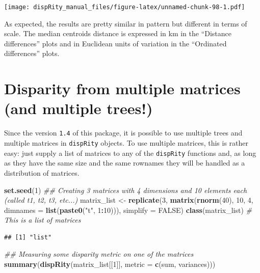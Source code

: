 \documentclass[]{book}
\newenvironment{Shaded}{\begin{snugshade}}{\end{snugshade}}
\newcommand{\CommentTok}[1]{\textcolor[rgb]{0.56,0.35,0.01}{\textit{#1}}}
\newcommand{\DataTypeTok}[1]{\textcolor[rgb]{0.13,0.29,0.53}{#1}}
\newcommand{\DecValTok}[1]{\textcolor[rgb]{0.00,0.00,0.81}{#1}}
\newcommand{\KeywordTok}[1]{\textcolor[rgb]{0.13,0.29,0.53}{\textbf{#1}}}
\newcommand{\NormalTok}[1]{#1}
\newcommand{\OperatorTok}[1]{\textcolor[rgb]{0.81,0.36,0.00}{\textbf{#1}}}
\newcommand{\OtherTok}[1]{\textcolor[rgb]{0.56,0.35,0.01}{#1}}
\newcommand{\StringTok}[1]{\textcolor[rgb]{0.31,0.60,0.02}{#1}}
\begin{document}
\texttt{[image: dispRity\_manual\_files/figure-latex/unnamed-chunk-98-1.pdf]}

As expected, the results are pretty similar in pattern but different in terms of scale.
The median centroids distance is expressed in km in the ``Distance differences'' plots and in Euclidean units of variation in the ``Ordinated differences'' plots.

\hypertarget{multi.input}{%
\section{Disparity from multiple matrices (and multiple trees!)}\label{multi.input}}

Since the version \texttt{1.4} of this package, it is possible to use multiple trees and multiple matrices in \texttt{dispRity} objects.
To use multiple matrices, this is rather easy: just supply a list of matrices to any of the \texttt{dispRity} functions and, as long as they have the same size and the same rownames they will be handled as a distribution of matrices.

\begin{Shaded}
\begin{Highlighting}[]
\KeywordTok{set.seed}\NormalTok{(}\DecValTok{1}\NormalTok{)}
\CommentTok{## Creating 3 matrices with 4 dimensions and 10 elements each (called t1, t2, t3, etc...)}
\NormalTok{matrix_list <-}\StringTok{ }\KeywordTok{replicate}\NormalTok{(}\DecValTok{3}\NormalTok{, }\KeywordTok{matrix}\NormalTok{(}\KeywordTok{rnorm}\NormalTok{(}\DecValTok{40}\NormalTok{), }\DecValTok{10}\NormalTok{, }\DecValTok{4}\NormalTok{, }\DataTypeTok{dimnames =} \KeywordTok{list}\NormalTok{(}\KeywordTok{paste0}\NormalTok{(}\StringTok{"t"}\NormalTok{, }\DecValTok{1}\OperatorTok{:}\DecValTok{10}\NormalTok{))),}
                         \DataTypeTok{simplify =} \OtherTok{FALSE}\NormalTok{)}
\KeywordTok{class}\NormalTok{(matrix_list) }\CommentTok{# This is a list of matrices}
\end{Highlighting}
\end{Shaded}

\begin{verbatim}
## [1] "list"
\end{verbatim}

\begin{Shaded}
\begin{Highlighting}[]
\CommentTok{## Measuring some disparity metric on one of the matrices}
\KeywordTok{summary}\NormalTok{(}\KeywordTok{dispRity}\NormalTok{(matrix_list[[}\DecValTok{1}\NormalTok{]], }\DataTypeTok{metric =} \KeywordTok{c}\NormalTok{(sum, variances)))}
\end{Highlighting}
\end{Shaded}
\end{document}
